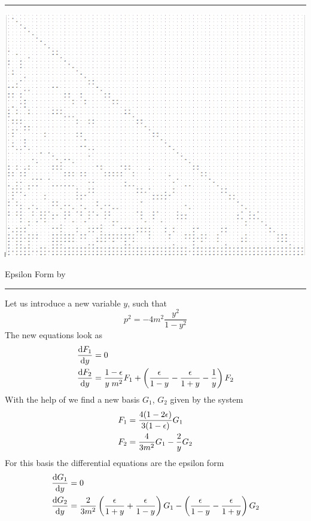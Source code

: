 \documentclass[11pt]{article}
\newcommand{\titleb}[2]{{\color{Blue}{\LARGE #1}\hfill{\Large #2}\vspace{-2mm}\par\rule{\textwidth}{1pt}\vs}}
\newcommand{\titlea}[1]{\titleb{#1}{}}
\begin{document}
\titlea{A few words on \fuchsia}
\centerline{ \includegraphics[width=0.8\pagewidth]{img/matrix.png} }
\newpage


\titleb{Example 1}{Epsilon Form by \fuchsia}
Let us introduce a new variable $y$, such that
$$p^2 = -4m^2\frac{y^2}{1-y^2}$$%
The new equations look as
  $$
    \begin{aligned}
     \frac{\mathrm{d} F_1}{\mathrm{d} y} & = 0
     \\
     \frac{\mathrm{d} F_2}{\mathrm{d} y} & = \frac{1-\epsilon}{y \; m^2} F_1 + \left( \frac{\epsilon}{1-y} - \frac{\epsilon}{1+y} - \frac{1}{y} \right) F_2
    \end{aligned}
  $$%
With the help of \fuchsia we find a new basis $G_1$, $G_2$ given by the system
  $$
    \begin{aligned}
     F_1 & = \frac{4(1-2\epsilon)}{3(1-\epsilon)} G_1
     \\
     F_2 & = \frac{4}{3m^2} G_1 - \frac{2}{y} G_2
    \end{aligned}
  $$%
For this basis the differential equations are the epsilon form
  $$
    \begin{aligned}
     \frac{\mathrm{d} G_1}{\mathrm{d} y} & = 0
     \\
     \frac{\mathrm{d} G_2}{\mathrm{d} y} & = \frac{2}{3m^2}\left( \frac{\epsilon}{1+y}+\frac{\epsilon}{1-y} \right) G_1 - \left(\frac{\epsilon}{1-y}-\frac{\epsilon}{1+y}\right) G_2
    \end{aligned}
  $$
\newpage
\end{document}
